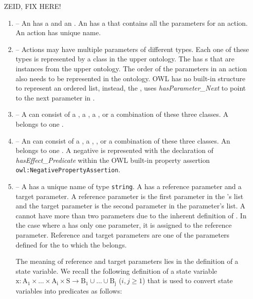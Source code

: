 ZEID, FIX HERE!

\begin{enumerate}
\item {} -- An  has a  and an . An  has a  that contains all the parameters for an action. An action has unique name.
\item {} -- Actions may have multiple parameters of different types. Each one of these types is represented by a class in the upper ontology. The  has s that are instances from the upper ontology. The order of the parameters in an  action also needs to be represented in the ontology. OWL has no built-in structure to represent an ordered list, instead, the , uses \emph{hasParameter\_Next} to point to the next parameter in .
\item {} -- A  can consist of a , a , a , or a combination of these three classes. A  belongs to one .
\item {} -- An  can consist of a , a , , or a combination of these three classes. An  belongs to one . A negative  is represented with the declaration of \emph{hasEffect\_Predicate} within the OWL built-in property assertion \texttt{owl:NegativePropertyAssertion}.
\item {} -- A  has a unique name  of type \texttt{string}. A  has a reference parameter and a target parameter. A reference parameter is the first parameter in the 's list and the target parameter is the second parameter in the parameter's list. A  cannot have more than two parameters due to the inherent definition of . In the case where a  has only one parameter, it is assigned to the reference parameter. Reference and target parameters are one of the parameters defined for the  to which the  belongs.
    
    The meaning of reference and target parameters lies in the definition of a state variable. We recall the following definition of a state variable $\mathrm{x: A_1\times \dots\times A_i\times S\rightarrow B_1\cup\dots\cup B_j}$ ($i, j\geq 1$) that is used to convert state variables into predicates as follows:


\end{enumerate}
